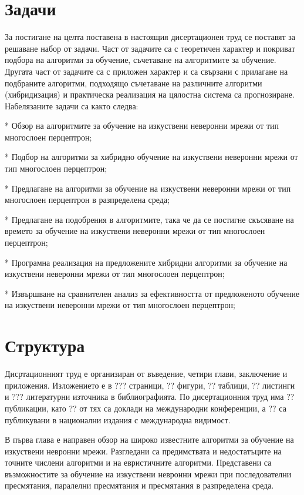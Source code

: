 \section*{Задачи}

За постигане на целта поставена в настоящия дисертационен труд се поставят за решаване набор от задачи. Част от задачите са с теоретичен характер и покриват подбора на алгоритми за обучение, съчетаване на алгоритмите за обучение. Другата част от задачите са с приложен характер и са свързани с прилагане на подбраните алгоритми, подходящо съчетаване на различните алгоритми (хибридизация) и практическа реализация на цялостна система са прогнозиране. Набелязаните задачи са както следва:

* Обзор на алгоритмите за обучение на изкуствени неверонни мрежи от тип многослоен перцептрон;

* Подбор на алгоритми за хибридно обучение на изкуствени неверонни мрежи от тип многослоен перцептрон;

* Предлагане на алгоритми за обучение на изкуствени неверонни мрежи от тип многослоен перцептрон в разпределена среда;

* Предлагане на подобрения в алгоритмите, така че да се постигне скъсяване на времето за обучение на изкуствени неверонни мрежи от тип многослоен перцептрон;

* Програмна реализация на предложените хибридни алгоритми за обучение на изкуствени неверонни мрежи от тип многослоен перцептрон;

* Извършване на сравнителен анализ за ефективността от предложеното обучение на изкуствени неверонни мрежи от тип многослоен перцептрон;

\section*{Структура}

Дисртационният труд е организиран от въведение, четири глави, заключение и приложения. Изложението е в ??? страници, ?? фигури, ?? таблици, ?? листинги и ??? литературни източника в библиографията. По дисертационния труд има ?? публикации, като ?? от тях са доклади на международни конференции, а ?? са публикувани в национални издания с международна видимост. 

В първа глава е направен обзор на широко известните алгоритми за обучение на изкуствени невронни мрежи. Разгледани са предимствата и недостатъците на точните числени алгоритми и на евристичните алгоритми. Представени са възможностите за обучение на изкуствени невронни мрежи при последователни пресмятания, паралелни пресмятания и пресмятания в разпределена среда.

